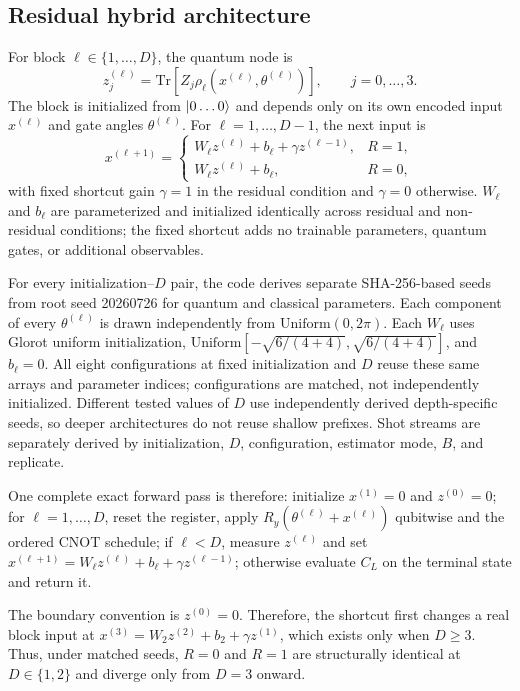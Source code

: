 \documentclass[pdflatex,sn-mathphys-num,Numbered]{sn-jnl}
\begin{document}
\subsection{Residual hybrid architecture}
\label{sec:residual-arch}

For block $\ell\in\{1,\ldots,D\}$, the quantum node is
\[
z_j^{(\ell)}
=\mathrm{Tr}\!\left[Z_j\rho_\ell
  \!\left(x^{(\ell)},\theta^{(\ell)}\right)\right],
\qquad j=0,\ldots,3.
\]
The block is initialized from $\ket{0\ldots0}$ and depends only on its own encoded input $x^{(\ell)}$ and gate angles $\theta^{(\ell)}$. For $\ell=1,\ldots,D-1$, the next input is
\[
x^{(\ell+1)}=
\begin{cases}
W_\ell z^{(\ell)}+b_\ell+\gamma z^{(\ell-1)}, & R=1,\\[3pt]
W_\ell z^{(\ell)}+b_\ell, & R=0,
\end{cases}
\]
with fixed shortcut gain $\gamma=1$ in the residual condition and $\gamma=0$ otherwise. $W_\ell$ and $b_\ell$ are parameterized and initialized identically across residual and non-residual conditions; the fixed shortcut adds no trainable parameters, quantum gates, or additional observables.

For every initialization--$D$ pair, the code derives separate SHA-256-based seeds from root seed 20260726 for quantum and classical parameters. Each component of every $\theta^{(\ell)}$ is drawn independently from $\mathrm{Uniform}(0,2\pi)$. Each $W_\ell$ uses Glorot uniform initialization, $\mathrm{Uniform}[-\sqrt{6/(4+4)},\sqrt{6/(4+4)}]$, and $b_\ell=0$. All eight configurations at fixed initialization and $D$ reuse these same arrays and parameter indices; configurations are matched, not independently initialized. Different tested values of $D$ use independently derived depth-specific seeds, so deeper architectures do not reuse shallow prefixes. Shot streams are separately derived by initialization, $D$, configuration, estimator mode, $B$, and replicate.

One complete exact forward pass is therefore: initialize $x^{(1)}=0$ and $z^{(0)}=0$; for $\ell=1,\ldots,D$, reset the register, apply $R_y(\theta^{(\ell)}+x^{(\ell)})$ qubitwise and the ordered CNOT schedule; if $\ell<D$, measure $z^{(\ell)}$ and set $x^{(\ell+1)}=W_\ell z^{(\ell)}+b_\ell+\gamma z^{(\ell-1)}$; otherwise evaluate $C_L$ on the terminal state and return it.

The boundary convention is $z^{(0)}=0$. Therefore, the shortcut first changes a real block input at $x^{(3)}=W_2z^{(2)}+b_2+\gamma z^{(1)}$, which exists only when $D\ge3$. Thus, under matched seeds, $R=0$ and $R=1$ are structurally identical at $D\in\{1,2\}$ and diverge only from $D=3$ onward.
\end{document}
